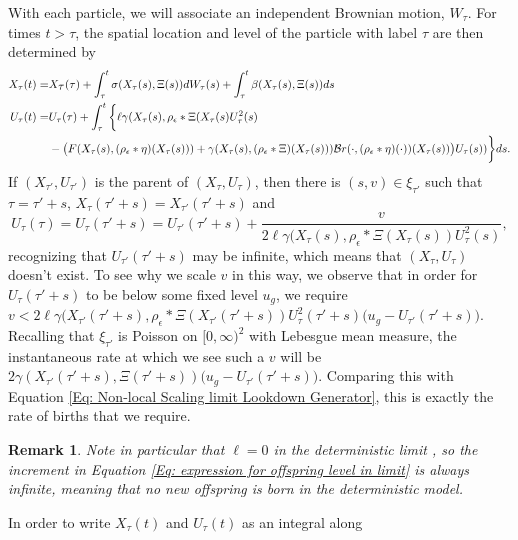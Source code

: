 \documentclass[12pt]{article}
\newtheorem{remark}[theorem]{Remark}
\begin{document}
With each particle, we will 
associate an independent Brownian motion, $W_\tau$. For times 
$t>\tau$, the spatial location and level of the particle with
label $\tau$ are then determined by
\begin{equation}\label{Eq: Expression for dynamics in scaling limit}
\begin{aligned}
X_{\tau}(t)=&X_{\mbox{\rm $\tau$}}(\tau )+\int_{\tau}^t\sigma (X_{
\tau}(s),\Xi (s))dW_{\tau}(s)+\int_{\tau}^t\beta (X_{\tau}(s),\Xi (
s))ds\\
U_{\tau}(t)=&U_{\tau}(\tau )+\int_{\tau}^t\bigg\{\ell \gamma(X_{\tau}(s),\rho_\epsilon*\Xi(X_{\tau}(s)U_{\tau}^2(s) \\
& -\big(F(X_{\tau}(s), (\rho_{\epsilon}*\eta)(X_{\tau}(s)))+\gamma(X_{\tau}(s), (\rho_{\epsilon}*\Xi)(X_{\tau}(s)))\mathcal{B}r(\cdot,(\rho_{\epsilon}*\eta)(\cdot))(X_{\tau}(s))\big)U_{\tau}(s))\bigg\}ds.
\end{aligned}
\end{equation}
If $(X_{\tau'},U_{\tau'})$ is the parent of $(X_{\tau},U_{\tau})$, 
then there is $(s,v)\in\xi_{\tau'}$ 
such that $\tau =\tau'+s$,
$X_{\tau}(\tau'+s)=X_{\tau'}(\tau'+s)$ and 
\begin{equation}
\label{Eq: expression for offspring level in limit}
U_{\tau}(\tau )=U_{\tau}(\tau'+s)=U_{\tau'}(\tau'+s)+\frac v{2\ell \gamma(X_{\tau}(s),\rho_\epsilon*\Xi(X_{\tau}(s))U_{\tau}^2(s)},
\end{equation} 
recognizing 
that $U_{\tau'}(\tau'+s)$ may be infinite, which means 
that $(X_{\tau}, U_{\tau})$ doesn't exist.
To see why we scale $v$ in this way, 
we observe that
in order for $U_{\tau}(\tau'+s)$ to be below some fixed level $u_g$,
we require 
$v<2\ell \gamma(X_{\tau'}(\tau'+s),\rho_\epsilon*\Xi(X_{\tau'}(\tau'+s))U_{\tau}^2(\tau'+s)\big(u_g-U_{\tau'}(\tau'+s)\big)$.
Recalling
that $\xi_{\tau'}$ is Poisson on $[0,\infty)^2$ with Lebesgue mean 
measure, the instantaneous rate at which we see such a $v$ will be
$2\gamma(X_{\tau'}(\tau'+s), \Xi(\tau'+s))\big(u_g-U_{\tau'}(\tau'+s)\big)$.
Comparing  this
with Equation
\eqref{Eq: Non-local Scaling limit Lookdown Generator}, this is exactly
the rate of births that we require.
\begin{remark}
Note in particular that $\ell=0$ in the deterministic limit , so the increment in Equation \eqref{Eq: expression for offspring level in limit} is always infinite, meaning that no new offspring is born in the deterministic model. 
\end{remark}
In order to write $X_\tau(t)$ and $U_\tau(t)$ as an integral along
\end{document}
